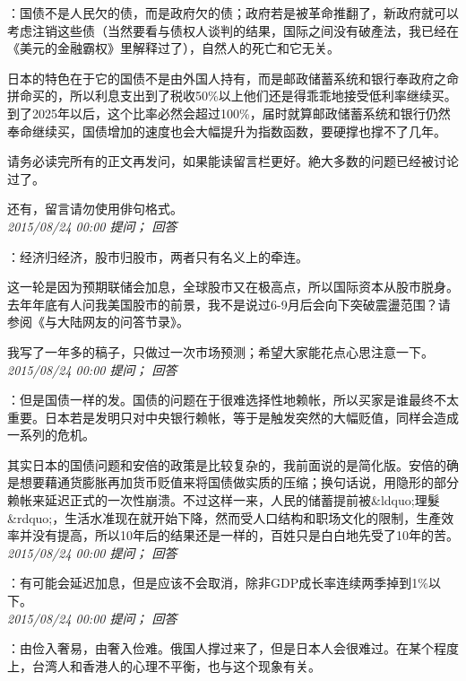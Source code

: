 \documentclass[twocolumn]{ctexart}
\begin{document}
：国债不是人民欠的债，而是政府欠的债；政府若是被革命推翻了，新政府就可以考虑注销这些债（当然要看与债权人谈判的结果，国际之间没有破產法，我已经在《美元的金融霸权》里解释过了），自然人的死亡和它无关。

日本的特色在于它的国债不是由外国人持有，而是邮政储蓄系统和银行奉政府之命拼命买的，所以利息支出到了税收50\%以上他们还是得乖乖地接受低利率继续买。到了2025年以后，这个比率必然会超过100\%，届时就算邮政储蓄系统和银行仍然奉命继续买，国债增加的速度也会大幅提升为指数函数，要硬撑也撑不了几年。

请务必读完所有的正文再发问，如果能读留言栏更好。絶大多数的问题已经被讨论过了。

还有，留言请勿使用俳句格式。\\

\textit{\hfill\noindent\small 2015/08/24 00:00 提问； 回答}

：经济归经济，股市归股市，两者只有名义上的牵连。

这一轮是因为预期联储会加息，全球股市又在极高点，所以国际资本从股市脱身。去年年底有人问我美国股市的前景，我不是说过6-9月后会向下突破震盪范围？请参阅《与大陆网友的问答节录》。

我写了一年多的稿子，只做过一次市场预测；希望大家能花点心思注意一下。\\

\textit{\hfill\noindent\small 2015/08/24 00:00 提问； 回答}

：但是国债一样的发。国债的问题在于很难选择性地赖帐，所以买家是谁最终不太重要。日本若是发明只对中央银行赖帐，等于是触发突然的大幅贬值，同样会造成一系列的危机。

其实日本的国债问题和安倍的政策是比较复杂的，我前面说的是简化版。安倍的确是想要藉通货膨胀再加货币贬值来将国债做实质的压缩；换句话说，用隐形的部分赖帐来延迟正式的一次性崩溃。不过这样一来，人民的储蓄提前被\&ldquo;理髮\&rdquo;，生活水准现在就开始下降，然而受人口结构和职场文化的限制，生產效率并没有提高，所以10年后的结果还是一样的，百姓只是白白地先受了10年的苦。\\

\textit{\hfill\noindent\small 2015/08/24 00:00 提问； 回答}

：有可能会延迟加息，但是应该不会取消，除非GDP成长率连续两季掉到1\%以下。\\

\textit{\hfill\noindent\small 2015/08/24 00:00 提问； 回答}

：由俭入奢易，由奢入俭难。俄国人撑过来了，但是日本人会很难过。在某个程度上，台湾人和香港人的心理不平衡，也与这个现象有关。\\
\end{document}
